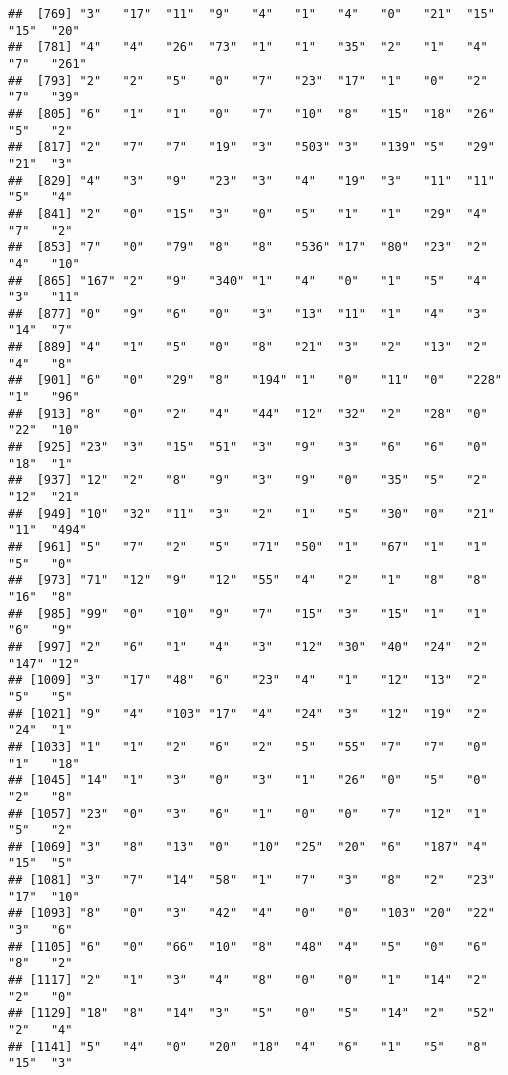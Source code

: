 \documentclass[
]{article}
\begin{document}
\begin{verbatim}
##  [769] "3"   "17"  "11"  "9"   "4"   "1"   "4"   "0"   "21"  "15"  "15"  "20" 
##  [781] "4"   "4"   "26"  "73"  "1"   "1"   "35"  "2"   "1"   "4"   "7"   "261"
##  [793] "2"   "2"   "5"   "0"   "7"   "23"  "17"  "1"   "0"   "2"   "7"   "39" 
##  [805] "6"   "1"   "1"   "0"   "7"   "10"  "8"   "15"  "18"  "26"  "5"   "2"  
##  [817] "2"   "7"   "7"   "19"  "3"   "503" "3"   "139" "5"   "29"  "21"  "3"  
##  [829] "4"   "3"   "9"   "23"  "3"   "4"   "19"  "3"   "11"  "11"  "5"   "4"  
##  [841] "2"   "0"   "15"  "3"   "0"   "5"   "1"   "1"   "29"  "4"   "7"   "2"  
##  [853] "7"   "0"   "79"  "8"   "8"   "536" "17"  "80"  "23"  "2"   "4"   "10" 
##  [865] "167" "2"   "9"   "340" "1"   "4"   "0"   "1"   "5"   "4"   "3"   "11" 
##  [877] "0"   "9"   "6"   "0"   "3"   "13"  "11"  "1"   "4"   "3"   "14"  "7"  
##  [889] "4"   "1"   "5"   "0"   "8"   "21"  "3"   "2"   "13"  "2"   "4"   "8"  
##  [901] "6"   "0"   "29"  "8"   "194" "1"   "0"   "11"  "0"   "228" "1"   "96" 
##  [913] "8"   "0"   "2"   "4"   "44"  "12"  "32"  "2"   "28"  "0"   "22"  "10" 
##  [925] "23"  "3"   "15"  "51"  "3"   "9"   "3"   "6"   "6"   "0"   "18"  "1"  
##  [937] "12"  "2"   "8"   "9"   "3"   "9"   "0"   "35"  "5"   "2"   "12"  "21" 
##  [949] "10"  "32"  "11"  "3"   "2"   "1"   "5"   "30"  "0"   "21"  "11"  "494"
##  [961] "5"   "7"   "2"   "5"   "71"  "50"  "1"   "67"  "1"   "1"   "5"   "0"  
##  [973] "71"  "12"  "9"   "12"  "55"  "4"   "2"   "1"   "8"   "8"   "16"  "8"  
##  [985] "99"  "0"   "10"  "9"   "7"   "15"  "3"   "15"  "1"   "1"   "6"   "9"  
##  [997] "2"   "6"   "1"   "4"   "3"   "12"  "30"  "40"  "24"  "2"   "147" "12" 
## [1009] "3"   "17"  "48"  "6"   "23"  "4"   "1"   "12"  "13"  "2"   "5"   "5"  
## [1021] "9"   "4"   "103" "17"  "4"   "24"  "3"   "12"  "19"  "2"   "24"  "1"  
## [1033] "1"   "1"   "2"   "6"   "2"   "5"   "55"  "7"   "7"   "0"   "1"   "18" 
## [1045] "14"  "1"   "3"   "0"   "3"   "1"   "26"  "0"   "5"   "0"   "2"   "8"  
## [1057] "23"  "0"   "3"   "6"   "1"   "0"   "0"   "7"   "12"  "1"   "5"   "2"  
## [1069] "3"   "8"   "13"  "0"   "10"  "25"  "20"  "6"   "187" "4"   "15"  "5"  
## [1081] "3"   "7"   "14"  "58"  "1"   "7"   "3"   "8"   "2"   "23"  "17"  "10" 
## [1093] "8"   "0"   "3"   "42"  "4"   "0"   "0"   "103" "20"  "22"  "3"   "6"  
## [1105] "6"   "0"   "66"  "10"  "8"   "48"  "4"   "5"   "0"   "6"   "8"   "2"  
## [1117] "2"   "1"   "3"   "4"   "8"   "0"   "0"   "1"   "14"  "2"   "2"   "0"  
## [1129] "18"  "8"   "14"  "3"   "5"   "0"   "5"   "14"  "2"   "52"  "2"   "4"  
## [1141] "5"   "4"   "0"   "20"  "18"  "4"   "6"   "1"   "5"   "8"   "15"  "3"  

\end{verbatim}
\end{document}
